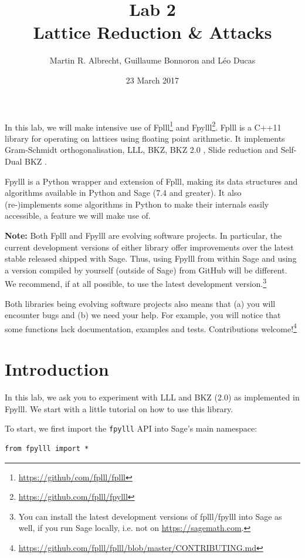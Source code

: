 \documentclass[10pt,a4paper,nobib]{tufte-handout}
\author{Martin R. Albrecht, Guillaume Bonnoron and Léo Ducas}
\date{23 March 2017}
\title{Lab 2\\\medskip
\large Lattice Reduction \& Attacks}
\begin{document}
\maketitle
In this lab, we will make intensive use of Fplll\footnote{\url{https://github/com/fplll/fplll}} and Fpylll\footnote{\url{https://github.com/fplll/fpylll}}. Fplll is a C++11 library for operating on lattices using floating point arithmetic. It implements Gram-Schmidt orthogonalisation, LLL, BKZ, BKZ 2.0 , Slide reduction  and Self-Dual BKZ .

Fpylll is a Python wrapper and extension of Fplll, making its data structures and algorithms available in Python and Sage (7.4 and greater). It also (re-)implements some algorithms in Python to make their internals easily accessible, a feature we will make use of.

\textbf{Note:} Both Fplll and Fpylll are evolving software projects. In particular, the current development versions of either library offer improvements over the latest stable released shipped with Sage. Thus, using Fpylll from within Sage and using a version compiled by yourself (outside of Sage) from GitHub will be different. We recommend, if at all possible, to use the latest development version.\footnote{You can install the latest development versions of fplll/fpylll into Sage as well, if you run Sage locally, i.e. not on \url{https://sagemath.com}.}

Both libraries being evolving software projects also means that (a) you will encounter bugs and (b) we need your help. For example, you will notice that some functions lack documentation, examples and tests. Contributions welcome!\footnote{\url{https://github.com/fplll/fplll/blob/master/CONTRIBUTING.md}}

\section{Introduction}
\label{sec:org36b3151}
In this lab, we ask you to experiment with LLL and BKZ (2.0) as implemented in Fpylll. We start with a little tutorial on how to use this library. 

To start, we first import the \texttt{fpylll} API into Sage’s main namespace:

\lstset{language=sage,label= ,caption= ,captionpos=b,numbers=none}
\begin{lstlisting}
from fpylll import *
\end{lstlisting}
\end{document}
